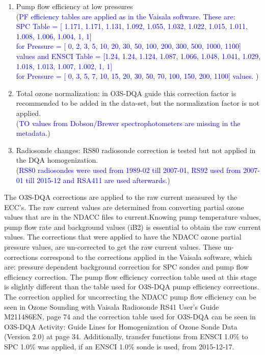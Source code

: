 \begin{enumerate}
        \item Pump flow efficiency at low pressures\\
        (\textcolor{blue}{PF efficiency tables are applied as in the Vaisala software.
        These are:\\
SPC Table = [ 1.171, 1.171, 1.131, 1.092, 1.055, 1.032, 1.022, 1.015, 1.011, 1.008, 1.006, 1.004,    1,    1]\\
         for Pressure  =    [    0,     2,     3,      5,    10,    20,    30,    50,   100,   200,   300,   500, 1000, 1100] values and
        ENSCI Table = [1.24, 1.24, 1.124, 1.087, 1.066, 1.048, 1.041, 1.029, 1.018, 1.013,  1.007, 1.002,     1,    1]\\
        for Pressure = [   0,    3,     5,     7,    10,    15,    20,    30,    50,    70,    100,   150,   200, 1100] values.
 })\\
        \item Total ozone normalization: in O3S-DQA guide this correction factor is recommended to be added in the data-set,
        but the normalization factor is not applied.\\
            (\textcolor{blue}{TO values from Dobson/Brewer spectrophotometers are missing in the metadata.})\\
        \item Radiosonde changes: RS80 radiosonde correction is tested but not applied in the DQA homogenization.\\
          (\textcolor{blue}{RS80 radiosondes were used from 1989-02 till 2007-01, RS92 used from 2007-01 till 2015-12 and RSA411
          are used afterwards.})\\
\end{enumerate}

The O3S-DQA corrections are applied to the raw current measured by the ECC's. The raw current values are
determined from converting partial ozone values that are
in the NDACC files to current.Knowing pump temperature values, pump flow rate and background values (iB2) is essential
to obtain the raw current values.
The corrections that were applied to have the NDACC ozone partial pressure values, are un-corrected to
get the raw current values. These un-corrections correspond to the corrections applied in the Vaisala software, which are:
pressure dependent background correction for SPC sondes and pump flow
efficiency correction. The pump flow efficiency correction table used at this stage is slightly different than the table used
for O3S-DQA pump efficiency corrections.
The correction applied for uncorrecting the NDACC pump flow efficiency can be seen in Ozone Sounding with Vaisala
Radiosonde RS41 User's Guide M211486EN, page 74 and the correction table
used for O3S-DQA can be seen in O3S-DQA Activity: Guide Lines for Homogenization of Ozone Sonde Data (Version 2.0)
at page 34. Additionally, transfer functions from ENSCI 1.0\% to SPC 1.0\% was applied, if an ENSCI 1.0\% sonde is used,
from 2015-12-17.


